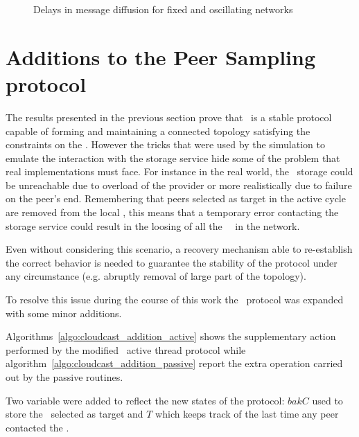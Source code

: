 \begin{figure}[H]
  \centering
  \caption{Delays in message diffusion for fixed and oscillating networks}
  \label{fig:cloudcast-sim-globa-delay}
\end{figure}

\section{Additions to the Peer Sampling protocol}
The results presented in the previous section prove that
\cloudcast\ is a stable protocol capable of forming and maintaining a
connected topology satisfying the constraints on the \cloud. However
the tricks that were used by the simulation to emulate the interaction
with the storage service hide some of the problem that real
implementations must face. For instance in the real world, the
\cloud\ storage could be unreachable due to overload of the provider
or more realistically due to failure on the peer's end. Remembering
that peers selected as target in the active cycle are removed from the
local \view, this means that a temporary error contacting the
storage service could result in the loosing of all the
\cloud\ \descriptor\ in the network.

Even without considering this scenario, a recovery mechanism able to
re-establish the correct behavior is needed to guarantee the stability
of the protocol under any circumstance (e.g. abruptly removal of large
part of the topology).

To resolve this issue during the course of this work the
\peersampling\ protocol was expanded with some minor additions.



Algorithms~\ref{algo:cloudcast_addition_active} shows the
supplementary action performed by the modified \cyclon\ active thread
protocol while algorithm~\ref{algo:cloudcast_addition_passive} report
the extra operation carried out by the passive routines.

Two variable were added to reflect the new states of the protocol:
$bakC$ used to store the \cloud\ \descriptor selected as target and
$T$ which keeps track of the last time any peer contacted the \cloud.

